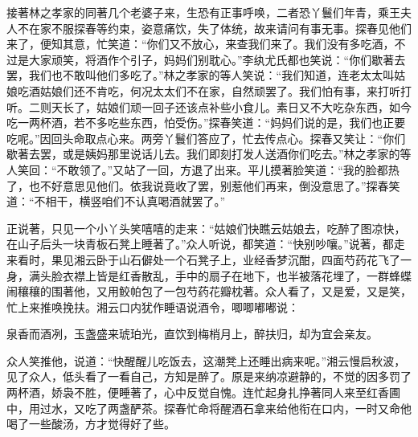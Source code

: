\begin{parag}
    接著林之孝家的同著几个老婆子来，生恐有正事呼唤，二者恐丫鬟们年青，乘王夫人不在家不服探春等约束，姿意痛饮，失了体统，故来请问有事无事。探春见他们来了，便知其意，忙笑道：“你们又不放心，来查我们来了。我们没有多吃酒，不过是大家顽笑，将酒作个引子，妈妈们别耽心。”李纨尤氏都也笑说：“你们歇著去罢，我们也不敢叫他们多吃了。”林之孝家的等人笑说：“我们知道，连老太太叫姑娘吃酒姑娘们还不肯吃，何况太太们不在家，自然顽罢了。我们怕有事，来打听打听。二则天长了，姑娘们顽一回子还该点补些小食儿。素日又不大吃杂东西，如今吃一两杯酒，若不多吃些东西，怕受伤。”探春笑道：“妈妈们说的是，我们也正要吃呢。”因回头命取点心来。两旁丫鬟们答应了，忙去传点心。探春又笑让：“你们歇著去罢，或是姨妈那里说话儿去。我们即刻打发人送酒你们吃去。”林之孝家的等人笑回：“不敢领了。”又站了一回，方退了出来。平儿摸著脸笑道：“我的脸都热了，也不好意思见他们。依我说竟收了罢，别惹他们再来，倒没意思了。”探春笑道：“不相干，横竖咱们不认真喝酒就罢了。”
\end{parag}


\begin{parag}
    正说著，只见一个小丫头笑嘻嘻的走来：“姑娘们快瞧云姑娘去，吃醉了图凉快，在山子后头一块青板石凳上睡著了。”众人听说，都笑道：“快别吵嚷。”说著，都走来看时，果见湘云卧于山石僻处一个石凳子上，业经香梦沉酣，四面芍药花飞了一身，满头脸衣襟上皆是红香散乱，手中的扇子在地下，也半被落花埋了，一群蜂蝶闹穰穰的围著他，又用鲛帕包了一包芍药花瓣枕著。众人看了，又是爱，又是笑，忙上来推唤挽扶。湘云口内犹作睡语说酒令，唧唧嘟嘟说：
\end{parag}


\begin{poem}
    \begin{pl}泉香而酒冽，玉盏盛来琥珀光，直饮到梅梢月上，醉扶归，却为宜会亲友。\end{pl}
\end{poem}


\begin{parag}
    众人笑推他，说道：“快醒醒儿吃饭去，这潮凳上还睡出病来呢。”湘云慢启秋波，见了众人，低头看了一看自己，方知是醉了。原是来纳凉避静的，不觉的因多罚了两杯酒，娇袅不胜，便睡著了，心中反觉自愧。连忙起身扎挣著同人来至红香圃中，用过水，又吃了两盏酽茶。探春忙命将醒酒石拿来给他衔在口内，一时又命他喝了一些酸汤，方才觉得好了些。
\end{parag}


